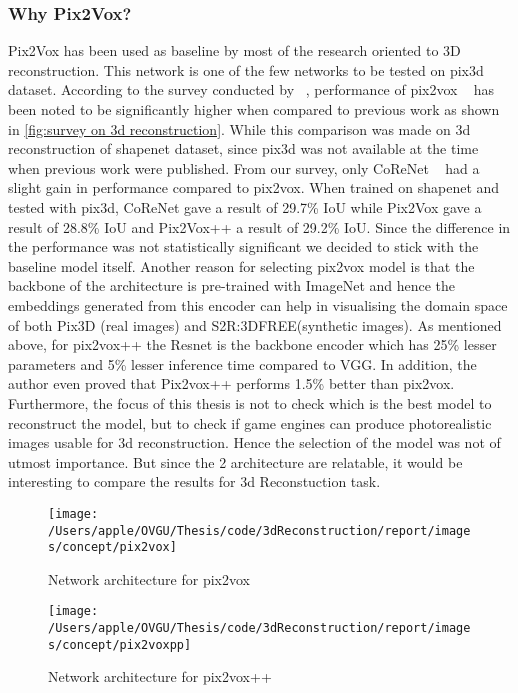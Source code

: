 \subsubsection{Why Pix2Vox?}
Pix2Vox has been used as baseline by most of the research oriented to 3D reconstruction.
This network is one of the few networks to be tested on pix3d dataset.
According to the survey conducted by ~\cite{Han2021ImageBased3O}, performance of pix2vox ~\cite{Xie_2019}
has been noted to be significantly higher when compared to previous work  as shown in \ref{fig:survey on 3d reconstruction}.
While this comparison was made on 3d reconstruction of shapenet dataset, since pix3d was not available at the time when previous work were published.
From our survey, only CoReNet ~\cite{popov2020corenet} had a slight gain in performance compared to pix2vox.
When trained on shapenet and tested with pix3d, CoReNet gave a result of 29.7\% IoU while Pix2Vox gave a result of 28.8\% IoU and Pix2Vox++ a result of 29.2\% IoU.
Since the difference in the performance was not statistically significant we decided to stick with the baseline model itself.
Another reason for selecting pix2vox model is that the backbone of the architecture is pre-trained with ImageNet and
hence the embeddings generated from this encoder can help in visualising the domain space of both Pix3D (real images) and S2R:3DFREE(synthetic images).
As mentioned above, for pix2vox++ the Resnet is the backbone encoder which has 25\% lesser parameters and 5\% lesser inference time compared to VGG.
In addition, the author even proved that Pix2vox++ performs 1.5\% better than pix2vox.
Furthermore, the focus of this thesis is not to check which is the best model to reconstruct the model, but to check if game engines can produce photorealistic images usable for 3d reconstruction.
Hence the selection of the model was not of utmost importance.
But since the 2 architecture are relatable, it would be interesting to compare the results for 3d Reconstuction task.
\begin{figure}
    \centering
    \texttt{[image: /Users/apple/OVGU/Thesis/code/3dReconstruction/report/images/concept/pix2vox]}
    \caption{Network architecture for pix2vox~\cite{Xie_2019}}
    \label{fig:pix2vox architecture}
\end{figure}

\begin{figure}
    \centering
    \texttt{[image: /Users/apple/OVGU/Thesis/code/3dReconstruction/report/images/concept/pix2voxpp]}
    \caption{Network architecture for pix2vox++~\cite{Xie_2020}}
    \label{fig:pix2voxpp architecture}
\end{figure}

